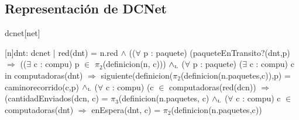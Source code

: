 \begin{Representacion}
  
  \section*{Representación de DCNet}

  \begin{Estructura}{dcnet}[net]
    \begin{Tupla}[net]
    \end{Tupla}
  
  
  \begin{Tupla}[infoPaquetes]
    \end{Tupla}
  \end{Estructura}


  \Rep[net][n]{}\mbox{}


  [n]{dnt: dcnet | red(dnt) = n.red  $\land$ (($\forall$ p : paquete) (paqueteEnTransito?(dnt,p) $\Rightarrow$ (($\exists$ c : compu) p $\in$ $\pi_2$(definicion(n, c))) $\land_{\mathrm{\scriptscriptstyle{L}}}$
 ($\forall$ p : paquete) ($\exists$ c : compu) c in computadoras(dnt) $\Rightarrow$ siguiente(definicion($\pi_2$(definicion(n.paquetes,c)),p) = caminorecorrido(c,p)  $\land_{\mathrm{\scriptscriptstyle{L}}}$
($\forall$ c : compu) (c $\in$ computadoras(red(dcn)) $\Rightarrow$ (cantidadEnviados(dcn, c) = $\pi_3$(definicion(n.paquetes, c) $\land_{\mathrm{\scriptscriptstyle{L}}}$ 
($\forall$ c : compu) c $\in$ computadoras(dnt) $\Rightarrow$ enEspera(dnt, c) = $\pi_2$(definicion(n.paquetes,c))}

\end{Representacion}



